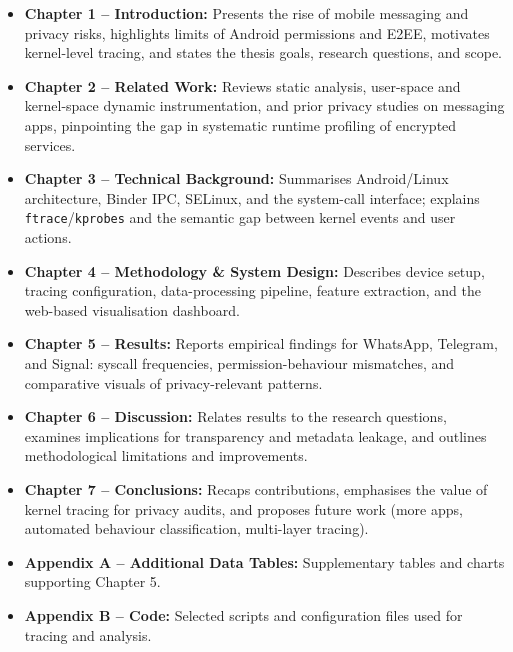 \documentclass[a4paper,12pt]{report}
\begin{document}
\begin{itemize}[leftmargin=1.7em]
  \item \textbf{Chapter 1 – Introduction:} Presents the rise of mobile messaging and privacy risks, highlights limits of Android permissions and E2EE, motivates kernel-level tracing, and states the thesis goals, research questions, and scope.

  \item \textbf{Chapter 2 – Related Work:} Reviews static analysis, user-space and kernel-space dynamic instrumentation, and prior privacy studies on messaging apps, pinpointing the gap in systematic runtime profiling of encrypted services.

  \item \textbf{Chapter 3 – Technical Background:} Summarises Android/Linux architecture, Binder IPC, SELinux, and the system-call interface; explains \texttt{ftrace}/\texttt{kprobes} and the semantic gap between kernel events and user actions.

  \item \textbf{Chapter 4 – Methodology \& System Design:} Describes device setup, tracing configuration, data-processing pipeline, feature extraction, and the web-based visualisation dashboard.

  \item \textbf{Chapter 5 – Results:} Reports empirical findings for WhatsApp, Telegram, and Signal: syscall frequencies, permission-behaviour mismatches, and comparative visuals of privacy-relevant patterns.

  \item \textbf{Chapter 6 – Discussion:} Relates results to the research questions, examines implications for transparency and metadata leakage, and outlines methodological limitations and improvements.

  \item \textbf{Chapter 7 – Conclusions:} Recaps contributions, emphasises the value of kernel tracing for privacy audits, and proposes future work (more apps, automated behaviour classification, multi-layer tracing).

  \item \textbf{Appendix A – Additional Data Tables:} Supplementary tables and charts supporting Chapter 5.

  \item \textbf{Appendix B – Code:} Selected scripts and configuration files used for tracing and analysis.
\end{itemize}
\end{document}
